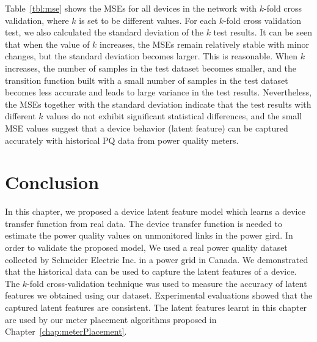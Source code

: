 Table~\ref{tbl:mse} shows the MSEs for all devices in the network with $k$-fold cross validation, where $k$ is set to be different values. For each $k$-fold cross validation test, we also calculated the standard deviation of the $k$ test results. It can be seen that when the value of $k$ increases, the MSEs remain relatively stable with minor changes, but the standard deviation becomes larger. This is reasonable. When $k$ increases, the number of samples in the test dataset becomes smaller, and the transition function built with a small number of samples in the test dataset becomes less accurate and leads to large variance in the test results. Nevertheless, the MSEs together with the standard deviation indicate that the test results with different $k$ values do not exhibit significant statistical differences, and the small MSE values suggest that a device behavior (latent feature) can be captured accurately with historical PQ data from power quality meters.

\section{Conclusion}
In this chapter, we proposed a device latent feature model which learns a device transfer function from real data. The device transfer function is needed to estimate the power quality values on unmonitored links in the power gird. In order to validate the proposed model, We used a real power quality dataset collected by Schneider Electric Inc. in a power grid in Canada. We demonstrated that the historical data can be used to capture the latent features of a device. The $k$-fold cross-validation technique was used to measure the accuracy of latent features we obtained using our dataset. Experimental evaluations showed that the captured latent features are consistent. The latent features learnt in this chapter are used by our meter placement algorithms proposed in Chapter~\ref{chap:meterPlacement}.